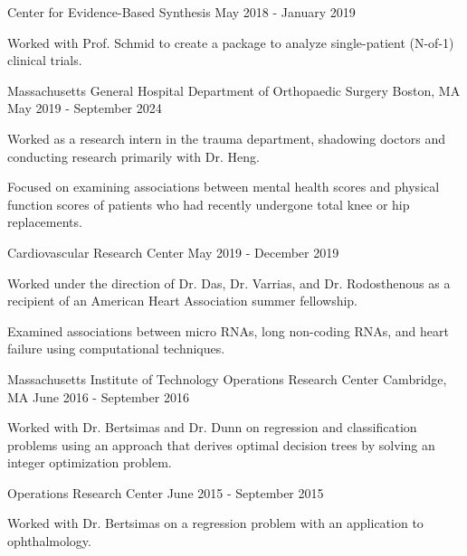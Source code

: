 \begin{cventries}
  \cventry
  {} %
  {Center for Evidence-Based Synthesis} %
  {} %
  {May 2018 - January 2019} %
  {
    \begin{cvitems} %
    \item {Worked with Prof. Schmid to create a package to analyze
      single-patient (N-of-1) clinical trials.}
    \end{cvitems}
  }

  \cventry
  {Massachusetts General Hospital} %
  {Department of Orthopaedic Surgery} %
  {Boston, MA} %
  {May 2019 - September 2024} %
  {
    \begin{cvitems} %
    \item {Worked as a research intern in the trauma department, shadowing
      doctors and conducting research primarily with Dr. Heng.}
    \item {Focused on examining associations between mental health scores
        and physical function scores of patients who had recently undergone
      total knee or hip replacements.}
    \end{cvitems}
  }

  \cventry
  {} %
  {Cardiovascular Research Center} %
  {} %
  {May 2019 - December 2019} %
  {
    \begin{cvitems} %
    \item {Worked under the direction of Dr. Das, Dr. Varrias, and Dr.
        Rodosthenous as a recipient of an American Heart Association summer
      fellowship.}
    \item {Examined associations between micro RNAs, long non-coding RNAs, and
      heart failure using computational techniques.}
    \end{cvitems}
  }

  \cventry
  {Massachusetts Institute of Technology} %
  {Operations Research Center} %
  {Cambridge, MA} %
  {June 2016 - September 2016} %
  {
    \begin{cvitems} %
    \item {Worked with Dr. Bertsimas and Dr. Dunn on regression and
        classification problems using an approach that derives optimal decision
      trees by solving an integer optimization problem.}
    \end{cvitems}
  }

  \cventry
  {} %
  {Operations Research Center} %
  {} %
  {June 2015 - September 2015} %
  {
    \begin{cvitems} %
    \item {Worked with Dr. Bertsimas on a regression problem with an
      application to ophthalmology.}
    \end{cvitems}
  }

\end{cventries}

